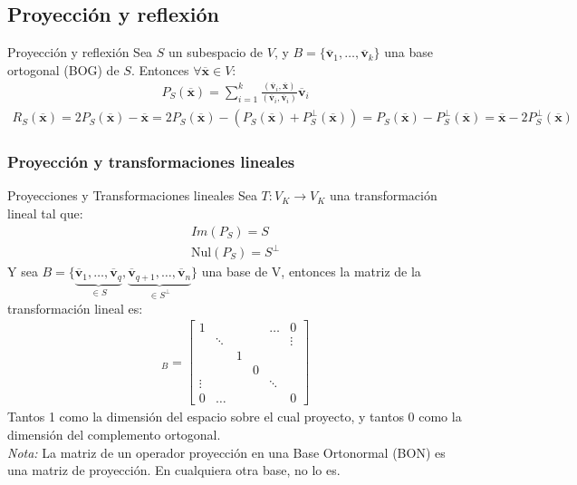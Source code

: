 \documentclass[a4paper, twoside]{article}
\numberwithin{equation}{section}
\numberwithin{figure}{section}
\numberwithin{table}{section}
\newcommand{\vect}[1]{\overline{\textbf{#1}}}
\newcommand{\nul}[1]{\text{Nul}(#1)}
\newcommand{\produ}[1]{(#1)}
\begin{document}
\subsection{Proyección y reflexión}
\begin{definicion*}{Proyección y reflexión}
	Sea $S$ un subespacio de $V$, y $B = \{ \vect{v}_1, \ldots, \vect{v}_k \}$ una base ortogonal (BOG) de $S$. Entonces $\forall \vect{x} \in V$:
	\begin{align}
		P_S(\vect{x}) = \sum_{i=1}^k \frac{ \produ{\vect{v}_i, \vect{x}} }{ \produ{\vect{v}_i, \vect{v}_i} } \vect{v}_i
	\end{align}
	\begin{align}
		R_S(\vect{x}) = 2 P_S(\vect{x}) - \vect{x} = 2 P_S(\vect{x}) - \left( P_S(\vect{x}) + P_S^\bot(\vect{x}) \right) = P_S(\vect{x}) - P_S^\bot(\vect{x}) = \vect{x} - 2 P_S^\bot(\vect{x})
	\end{align}
\end{definicion*}

\subsubsection{Proyección y transformaciones lineales}
\begin{definicion*}{Proyecciones y Transformaciones lineales}
	Sea $T:V_K \to V_K$ una transformación lineal tal que:
	\begin{align}
		Im(P_S)=S \\
		\nul{P_S}=S^\bot
	\end{align}
	Y sea $B = \{\underbrace{ \vect{v}_1, \ldots, \vect{v}_q }_{ \in S }, \underbrace{ \vect{v}_{q+1}, \ldots, \vect{v}_n }_{\in S^\bot} \}$ una base de V, entonces la matriz de la transformación lineal es:
	\begin{align}
	[P_S]_B = \begin{bmatrix}
				 {1} & { } & { } & { } & {\ldots} & {0} \\
				 { } & {\ddots} & { } & { } & { } & {\vdots} \\
				 { } & { } & {1} & { } & { } & { } \\
				 { } & { } & { } & {0} & { } & { } \\
				 {\vdots} & { } & { } & { } & {\ddots} & { } \\
				 {0} & {\ldots} & { } & { } & { } & {0}
			  \end{bmatrix}
	\end{align}
	Tantos 1 como la dimensión del espacio sobre el cual proyecto, y tantos 0 como la dimensión del complemento ortogonal.\\
	
	\emph{Nota:} La matriz de un operador proyección en una Base Ortonormal (BON) es una matriz de proyección. En cualquiera otra base, no lo es.
\end{definicion*}
\end{document}
